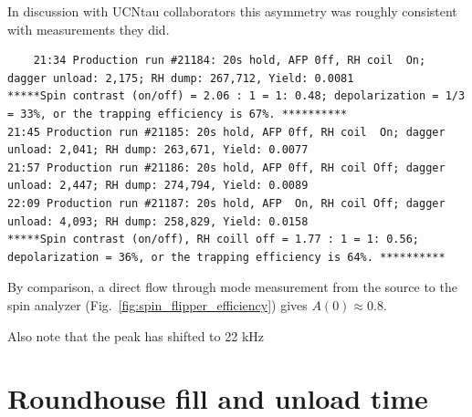 In discussion with UCNtau collaborators this asymmetry was roughly consistent with measurements they did.

\begin{tiny}
\begin{verbatim}
    21:34 Production run #21184: 20s hold, AFP 0ff, RH coil  On; dagger unload: 2,175; RH dump: 267,712, Yield: 0.0081
*****Spin contrast (on/off) = 2.06 : 1 = 1: 0.48; depolarization = 1/3 = 33%, or the trapping efficiency is 67%. ********** 
21:45 Production run #21185: 20s hold, AFP 0ff, RH coil  On; dagger unload: 2,041; RH dump: 263,671, Yield: 0.0077 
21:57 Production run #21186: 20s hold, AFP 0ff, RH coil Off; dagger unload: 2,447; RH dump: 274,794, Yield: 0.0089
22:09 Production run #21187: 20s hold, AFP  On, RH coil Off; dagger unload: 4,093; RH dump: 258,829, Yield: 0.0158
*****Spin contrast (on/off), RH coill off = 1.77 : 1 = 1: 0.56; depolarization = 36%, or the trapping efficiency is 64%. **********
\end{verbatim}
\end{tiny}

 By comparison, a direct flow through mode measurement from the \ucn source to the spin analyzer (Fig.~\ref{fig:spin_flipper_efficiency}) gives $A(0)\approx 0.8$.

 Also note that the peak has shifted to 22 kHz



\section{Roundhouse fill and unload time }



\begin{figure}

\end{figure}

